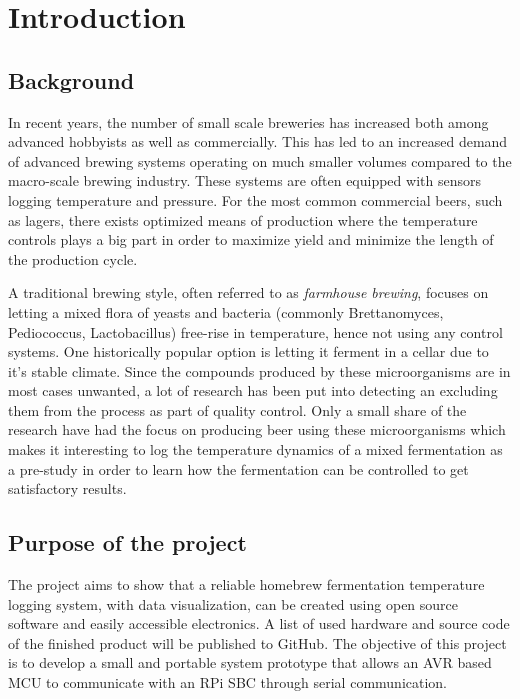 \section{Introduction}%
\label{sec:introduction}

\subsection{Background}%
\label{sub:background}
In recent years, the number of small scale breweries has increased both among advanced hobbyists as well as commercially. This has led to an increased demand of advanced brewing systems operating on much smaller volumes compared to the macro-scale brewing industry. These systems are often equipped with sensors logging temperature and pressure. For the most common commercial beers, such as lagers, there exists optimized means of production where the temperature controls plays a big part in order to maximize yield and minimize the length of the production cycle.

A traditional brewing style, often referred to as \textit{farmhouse brewing}, focuses on letting a mixed flora of yeasts and bacteria (commonly Brettanomyces, Pediococcus, Lactobacillus) free-rise in temperature, hence not using any control systems. One historically popular option is letting it ferment in a cellar due to it's stable climate. Since the compounds produced by these microorganisms are in most cases unwanted, a lot of research has been put into detecting an excluding them from the process as part of quality control. Only a small share of the research have had the focus on producing beer using these microorganisms which makes it interesting to log the temperature dynamics of a mixed fermentation as a pre-study in order to learn how the fermentation can be controlled to get satisfactory results.


\subsection{Purpose of the project}%
\label{sub:purpose_of_the_project}
The project aims to show that a reliable homebrew fermentation temperature logging system, with data visualization, can be created using open source software and easily accessible electronics. A list of used hardware and source code of the finished product will be published to GitHub. The objective of this project is to develop a small and portable system prototype that allows an AVR based MCU to communicate with an RPi SBC through serial communication.

